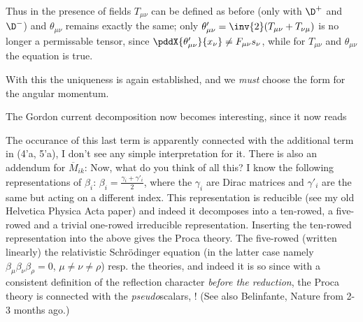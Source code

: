 Thus in the presence of fields $T_{\mu\nu}$ can be defined as before (only with $\D^+$ and $\D^-$) and $\theta_{\mu\nu}$ remains exactly the same; only $\theta'_{\mu\nu} = \inv{2}(T_{\mu\nu} + T_{\nu\mu})$ is no longer a permissable tensor, since $\pddX{\theta'_{\mu\nu}}{x_\nu} \neq F_{\mu\nu}s_\nu$, while for $T_{\mu\nu}$ and $\theta_{\mu\nu}$ the equation is true.

With this the uniqueness is again established, and we \textit{must} choose the form
for the angular momentum.

The Gordon current decomposition now becomes interesting, since it now reads

The occurance of this last term is apparently connected with the additional term in (4'a, 5'a),  I don't see any simple interpretation for it. There is also an addendum for $\overline{M}_{ik}$:
Now, what do you think of all this? I know the following representations of $\beta_i$: $\beta_i = \frac{\gamma_i+\gamma'_i}{2}$, where the $\gamma_i$ are Dirac matrices and $\gamma'_i$ are the same but acting on a different index. This representation is reducible (see my old Helvetica Physica Acta paper) and indeed it decomposes into a ten-rowed, a five-rowed and a trivial one-rowed irreducible representation. Inserting the ten-rowed representation into the above gives the Proca theory. The five-rowed (written linearly)  the relativistic Schr\"odinger equation (in the latter case namely $\beta_\mu\beta_\nu\beta_\rho=0$, $\mu\neq\nu\neq\rho$) resp. the  theories, and indeed it is so since with a consistent definition of the reflection character \textit{before the reduction}, the Proca theory is connected with the \textit{pseudo}scalars, ! (See also Belinfante, Nature from 2-3 months ago.)

